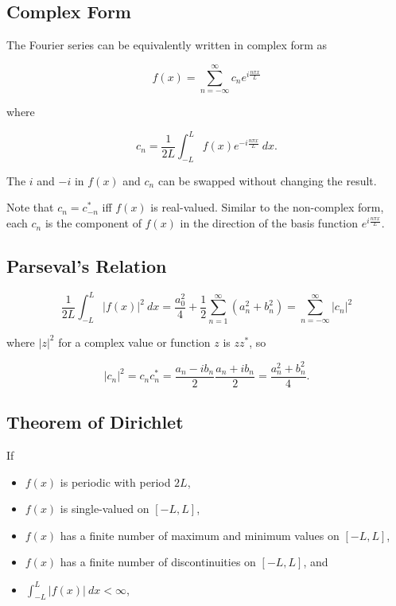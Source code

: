 \subsection{Complex Form}

The Fourier series can be equivalently written in complex form as

\begin{equation*}
    f(x) = \sum_{n=-\infty}^\infty c_n e^{i\frac{n\pi x}{L}}
\end{equation*}

where

\begin{equation*}
    c_n = \frac{1}{2L}\int_{-L}^L f(x)e^{-i\frac{n\pi x}{L}}~dx\text{.}
\end{equation*}

The $i$ and $-i$ in $f(x)$ and $c_n$ can be swapped without changing the result.

\vsp

Note that $c_n = c_{-n}^*$ iff $f(x)$ is real-valued. Similar to the non-complex form, each $c_n$ is the component of $f(x)$ in the direction of the basis function $e^{i\frac{n\pi x}{L}}$.

\subsection{Parseval's Relation}

\begin{equation*}
    \frac{1}{2L}\int_{-L}^L |f(x)|^2~dx = \frac{a_0^2}{4} + \frac{1}{2}\sum_{n=1}^\infty (a_n^2 + b_n^2) = \sum_{n=-\infty}^\infty |c_n|^2
\end{equation*}

where $|z|^2$ for a complex value or function $z$ is $z z^*$, so

\begin{equation}
    |c_n|^2 = c_n c_n^* = \frac{a_n - ib_n}{2} \frac{a_n + ib_n}{2} = \frac{a_n^2 + b_n^2}{4}\text{.}
\end{equation}

\subsection{Theorem of Dirichlet}

If

\begin{itemize}
    \item $f(x)$ is periodic with period $2L$,
    \item $f(x)$ is single-valued on $[-L,L]$,
    \item $f(x)$ has a finite number of maximum and minimum values on $[-L,L]$,
    \item $f(x)$ has a finite number of discontinuities on $[-L,L]$, and
    \item $\int_{-L}^L |f(x)|~dx < \infty$,
\end{itemize}

